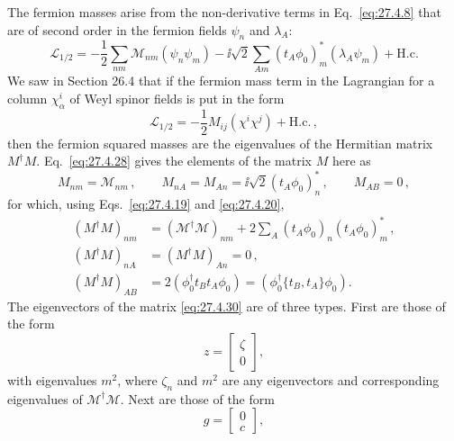 The fermion masses arise from the non-derivative terms in
Eq.~\eqref{eq:27.4.8} that are of second order in the fermion fields
\(\psi_n\) and \(\lambda_A\):
\begin{equation}
  \mathcal{L}_{1/2}
  =-\frac12\sum_{nm}\mathcal{M}_{nm}
    \left(\psi_n\psi_m\right)
  -\ii\sqrt{2}\sum_{Am}(t_A\phi_0)_m^*
    \left(\lambda_A\psi_m\right)
  +\mathrm{H.c.}
  \tag{27.4.28}\label{eq:27.4.28}
\end{equation}
We saw in Section 26.4 that if the fermion mass term in the Lagrangian for a
column \(\chi^i_\alpha\) of Weyl spinor fields is put in the form
\begin{equation}
  \mathcal{L}_{1/2}
  =-\frac12 M_{ij}\left(\chi^i\chi^j\right)
  +\mathrm{H.c.}\,,
  \tag{27.4.29}\label{eq:27.4.29}
\end{equation}
then the fermion squared masses are the eigenvalues of the Hermitian matrix
\(M^\dagger M\). Eq.~\eqref{eq:27.4.28} gives the elements of the matrix
\(M\) here as
\begin{equation}
  M_{nm}=\mathcal{M}_{nm}\,,
  \qquad
  M_{nA}=M_{An}=\ii\sqrt{2}(t_A\phi_0)_n^*\,,
  \qquad
  M_{AB}=0\,,
  \tag{27.4.30}\label{eq:27.4.30}
\end{equation}
for which, using Eqs.~\eqref{eq:27.4.19} and \eqref{eq:27.4.20},
\begin{equation}
  \begin{aligned}
  (M^\dagger M)_{nm}
  &=(\mathcal{M}^\dagger\mathcal{M})_{nm}
    +2\sum_A(t_A\phi_0)_n(t_A\phi_0)_m^*\,,
  \\
  (M^\dagger M)_{nA}
  &=(M^\dagger M)_{An}=0\,,
  \\
  (M^\dagger M)_{AB}
  &=2\left(\phi_0^\dagger t_Bt_A\phi_0\right)
   =\left(\phi_0^\dagger\{t_B,t_A\}\phi_0\right).
  \end{aligned}
  \tag{27.4.31}\label{eq:27.4.31}
\end{equation}
The eigenvectors of the matrix \eqref{eq:27.4.30} are of three types. First
are those of the form
\begin{equation}
  z=
  \begin{bmatrix}
    \zeta\\
    0
  \end{bmatrix},
  \tag{27.4.32}\label{eq:27.4.32}
\end{equation}
with eigenvalues \(m^2\), where \(\zeta_n\) and \(m^2\) are any eigenvectors
and corresponding eigenvalues of \(\mathcal{M}^\dagger\mathcal{M}\). Next
are those of the form
\begin{equation}
  g=
  \begin{bmatrix}
    0\\
    c
  \end{bmatrix},
  \tag{27.4.33}\label{eq:27.4.33}
\end{equation}
